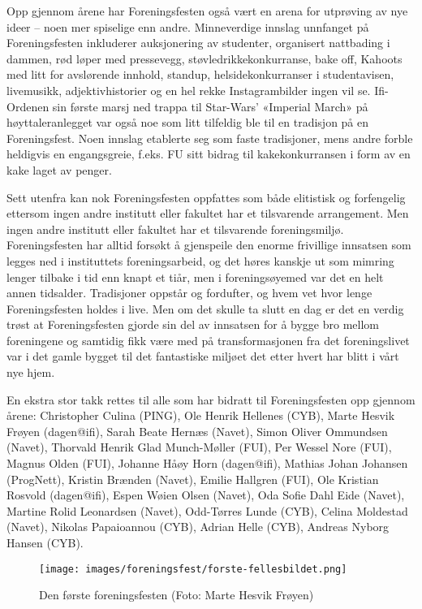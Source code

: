 Opp gjennom årene har Foreningsfesten også vært en arena for utprøving av nye ideer – noen mer spiselige enn andre. Minneverdige innslag unnfanget på Foreningsfesten inkluderer auksjonering av studenter, organisert nattbading i dammen, rød løper med pressevegg, støvledrikkekonkurranse, bake off, Kahoots med litt for avslørende innhold, standup, helsidekonkurranser i studentavisen, livemusikk, adjektivhistorier og en hel rekke Instagrambilder ingen vil se. Ifi-Ordenen sin første marsj ned trappa til Star-Wars' «Imperial March» på høyttaleranlegget var også noe som litt tilfeldig ble til en tradisjon på en Foreningsfest. Noen innslag etablerte seg som faste tradisjoner, mens andre forble heldigvis en engangsgreie, f.eks. FU sitt bidrag til kakekonkurransen i form av en kake laget av penger.

Sett utenfra kan nok Foreningsfesten oppfattes som både elitistisk og forfengelig ettersom ingen andre institutt eller fakultet har et tilsvarende arrangement. Men ingen andre institutt eller fakultet har et tilsvarende foreningsmiljø. Foreningsfesten har alltid forsøkt å gjenspeile den enorme frivillige innsatsen som legges ned i instituttets foreningsarbeid, og det høres kanskje ut som mimring lenger tilbake i tid enn knapt et tiår, men i foreningsøyemed var det en helt annen tidsalder. Tradisjoner oppstår og fordufter, og hvem vet hvor lenge Foreningsfesten holdes i live. Men om det skulle ta slutt en dag er det en verdig trøst at Foreningsfesten gjorde sin del av innsatsen for å bygge bro mellom foreningene og samtidig fikk være med på transformasjonen fra det foreningslivet var i det gamle bygget til det fantastiske miljøet det etter hvert har blitt i vårt nye hjem. 

En ekstra stor takk rettes til alle som har bidratt til Foreningsfesten opp gjennom årene: Christopher Culina (PING), Ole Henrik Hellenes (CYB), Marte Hesvik Frøyen (dagen@ifi), Sarah Beate Hernæs (Navet), Simon Oliver Ommundsen (Navet), Thorvald Henrik Glad Munch-Møller (FUI), Per Wessel Nore (FUI), Magnus Olden (FUI), Johanne Håøy Horn (dagen@ifi), Mathias Johan Johansen (ProgNett), Kristin Brænden (Navet), Emilie Hallgren (FUI), Ole Kristian Rosvold (dagen@ifi), Espen Wøien Olsen (Navet), Oda Sofie Dahl Eide (Navet), Martine Rolid Leonardsen (Navet), Odd-Tørres Lunde (CYB), Celina Moldestad (Navet), Nikolas Papaioannou (CYB), Adrian Helle (CYB), Andreas Nyborg Hansen (CYB).

\begin{sidewaysfigure}
    \centering
    	\texttt{[image: images/foreningsfest/forste-fellesbildet.png]}
	\label{fig:forste-fellesbilde}
	\caption{Den første foreningsfesten (Foto: Marte Hesvik Frøyen)}
\end{sidewaysfigure}